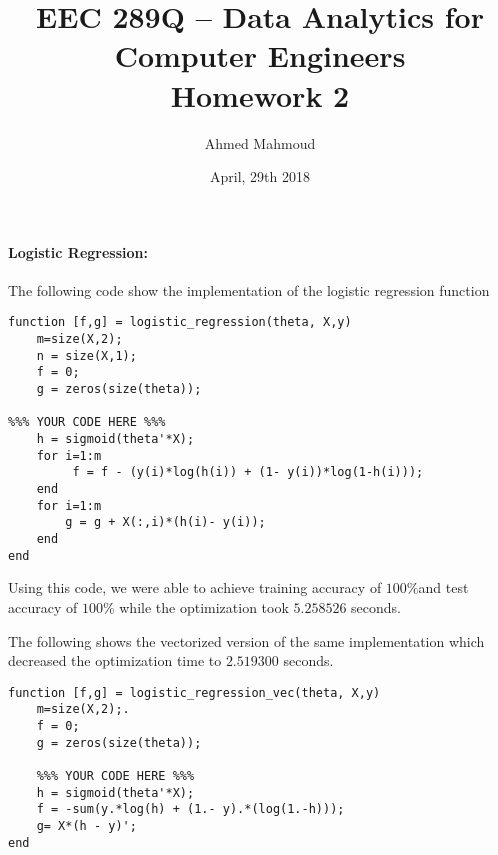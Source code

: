 \documentclass[12pt] {article}
\begin{document}
\title{EEC 289Q – Data Analytics for Computer Engineers \\ Homework 2}
\author{Ahmed Mahmoud}
\date{April, 29th 2018} 

\maketitle






\paragraph{Logistic Regression:} 
The following code show the implementation of the logistic regression function
\begin{lstlisting}
function [f,g] = logistic_regression(theta, X,y)
	m=size(X,2);
	n = size(X,1);  
	f = 0;
	g = zeros(size(theta));

%%% YOUR CODE HERE %%%
	h = sigmoid(theta'*X);
	for i=1:m
   		 f = f - (y(i)*log(h(i)) + (1- y(i))*log(1-h(i)));
	end
	for i=1:m
    	g = g + X(:,i)*(h(i)- y(i));
	end
end	
\end{lstlisting}

Using this code, we were able to achieve training accuracy of $100\%$and 
test accuracy of $100\%$ while the optimization took $5.258526 $ seconds.

The following shows the vectorized version of the same implementation which decreased the optimization time to $2.519300$ seconds. 

\begin{lstlisting}
function [f,g] = logistic_regression_vec(theta, X,y)
	m=size(X,2);.
	f = 0;
	g = zeros(size(theta));

	%%% YOUR CODE HERE %%%
	h = sigmoid(theta'*X);
	f = -sum(y.*log(h) + (1.- y).*(log(1.-h)));
	g= X*(h - y)';
end 
\end{lstlisting}
\end{document}
